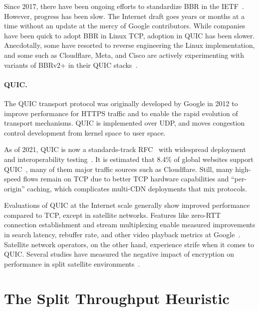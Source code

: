 Since 2017, there have been ongoing efforts to standardize BBR in the IETF~\cite{cardwell2024bbr-ietf-draft}.
However, progress has been slow. The Internet draft goes years or months at a
time without an update at the mercy of Google contributors. While companies
have been quick to adopt BBR in Linux TCP, adoption in QUIC has been slower.
Anecdotally, some have resorted to reverse engineering the Linux
implementation, and some such as Cloudflare, Meta, and Cisco are actively
experimenting with variants of BBRv2+ in their QUIC stacks~\cite
{cardwell2024bbrv3-ietf119-qna}.

\paragraph{QUIC.}

The QUIC transport protocol was originally developed by Google in 2012 to
improve performance for HTTPS traffic and to enable the rapid
evolution of transport mechanisms. QUIC is implemented over UDP, and moves
congestion control development from kernel space to user space.

As of 2021, QUIC is now a standards-track RFC~\cite{rfc9000} with widespread
deployment and interoperability testing~\cite{quic-interop}. It is estimated
that 8.4\% of global websites support QUIC~\cite{w3techs}, many of them major
traffic sources such as Cloudflare.
Still, many high-speed flows remain on TCP due to better TCP hardware
capabilities and ``per-origin'' caching, which complicates multi-CDN
deployments that mix protocols.

Evaluations of QUIC at the Internet scale generally show improved performance
compared to TCP, except in satellite networks. Features like zero-RTT
connection establishment and stream multiplexing enable measured improvements
in search latency, rebuffer rate, and other video playback metrics at
Google~\cite{langley2017quic}. Satellite network operators, on the other hand,
experience strife when it comes to QUIC. Several studies have measured the
negative impact of encryption on performance in split satellite
environments~\cite
{kosek2022quicpep,martin2022suitability,kuhn2021quic-over-sat,border2020evaluating}.

\section{The Split Throughput Heuristic}
\label{sec:splitting:heuristic}

